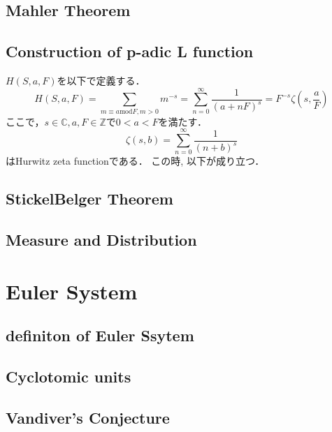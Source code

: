 \documentclass{ujarticle}
\begin{document}
\subsection{Mahler Theorem}
\label{sec:Mahler Theorem}

\subsection{Construction of p-adic L function}
\label{sub:Construction of p-adic L function}
$H(S,a,F)$を以下で定義する．
\begin{equation*}
 H(S,a,F)=\sum_{m \equiv a \mbox{mod}F,m >0}m^{-s}=\sum_{n=0}^{\infty}\frac{1}{(a+nF)^s}
       =F^{-s} \zeta(s,\frac{a}{F})
\end{equation*}
ここで，$s \in \mathbb{C},a,F \in \mathbb{Z}$で$0 < a< F$を満たす．
\begin{equation*}
  \zeta(s,b)=\sum_{n=0}^{\infty}\frac{1}{(n+b)^s}
\end{equation*}
はHurwitz zeta functionである．
この時,
以下が成り立つ．


\subsection{StickelBelger Theorem}
\label{sub:StickelBelger Theorem}


\subsection{Measure and Distribution}
\label{sub:Measure and Distribution}


\section{Euler System}
\label{sec:Euler System}

\subsection{definiton of Euler Ssytem}
\label{sub:definiton of Euler Ssytem}

\subsection{Cyclotomic units}
\label{sub:Cyclotomic units}

\subsection{Vandiver's Conjecture}
\label{sub:Vandiver's Conjecture}
\end{document}
